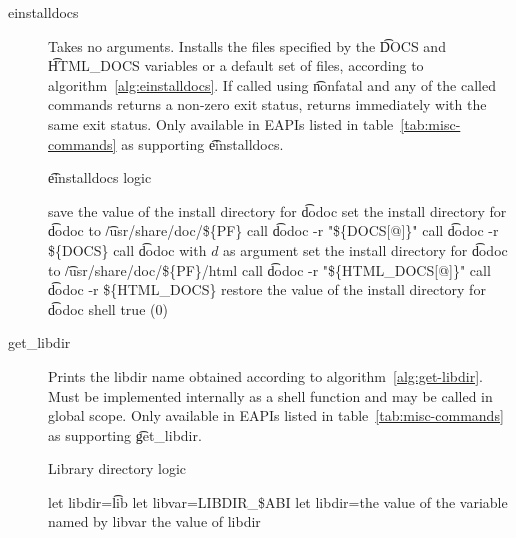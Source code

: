 \begin{description}
\item[einstalldocs]  Takes no arguments. Installs the files specified
    by the \t{DOCS} and \t{HTML_DOCS} variables or a default set of files, according to
    algorithm~\ref{alg:einstalldocs}. If called using \t{nonfatal} and any of the called commands
    returns a non-zero exit status, returns immediately with the same exit status. Only available
    in EAPIs listed in table~\ref{tab:misc-commands} as supporting \t{einstalldocs}.

\begin{algorithm}
\caption{\t{einstalldocs} logic} \label{alg:einstalldocs}
\begin{algorithmic}[1]
\STATE save the value of the install directory for \t{dodoc}
\STATE set the install directory for \t{dodoc} to \t{/usr/share/doc/\$\{PF\}}
    \STATE call \t{dodoc -r "\$\{DOCS[@]\}"}
    \STATE call \t{dodoc -r \$\{DOCS\}}
            \STATE call \t{dodoc} with $d$ as argument
        \ENDIF
    \ENDFOR
\ENDIF
\STATE set the install directory for \t{dodoc} to \t{/usr/share/doc/\$\{PF\}/html}
    \STATE call \t{dodoc -r "\$\{HTML_DOCS[@]\}"}
    \STATE call \t{dodoc -r \$\{HTML_DOCS\}}
\ENDIF
\STATE restore the value of the install directory for \t{dodoc}
\RETURN shell true (0)
\end{algorithmic}
\end{algorithm}

\item[get_libdir]  Prints the libdir name obtained according to
    algorithm~\ref{alg:get-libdir}. Must be implemented internally as a shell function and may be
    called in global scope. Only available in EAPIs listed in table~\ref{tab:misc-commands} as
    supporting \t{get_libdir}.

\begin{algorithm}
\caption{Library directory logic} \label{alg:get-libdir}
\begin{algorithmic}[1]
\STATE let libdir=\t{lib}
    \STATE let libvar=LIBDIR_\$ABI
        \STATE let libdir=the value of the variable named by libvar
    \ENDIF
\ENDIF
\RETURN the value of libdir
\end{algorithmic}
\end{algorithm}

\end{description}

